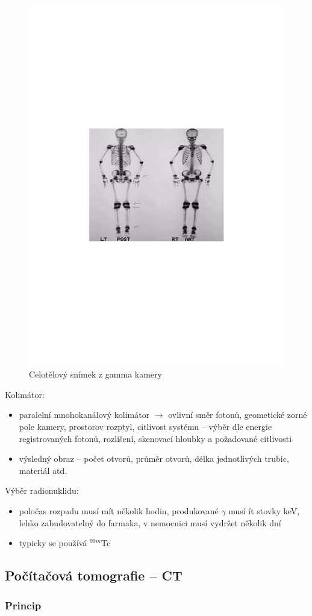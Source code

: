 \begin{figure}[H]
    \centering
    \includegraphics[width=0.5\linewidth, trim={2cm 8cm 2cm 8cm}, clip]{img/gamma_kamera_snimek.pdf}
    \caption{Celotělový snímek z gamma kamery}
    \label{fig:5_2_gamma_kamera_snimek}
\end{figure}

Kolimátor:

\begin{itemize}
    \item paralelní mnohokanálový kolimátor $\rightarrow$ ovlivní směr fotonů, geometické zorné pole kamery, prostorov rozptyl, citlivost systému -- výběr dle energie registrovaných fotonů, rozlišení, skenovací hloubky a požadované citlivosti
    \item výsledný obraz -- počet otvorů, průměr otvorů, délka jednotlivých trubic, materiál atd.
\end{itemize}

Výběr radionuklidu:

\begin{itemize}
    \item poločas rozpadu musí mít několik hodin, produkované $\gamma$ musí ít stovky keV, lehko zabudovatelný do farmaka, v nemocnici musí vydržet několik dní
    \item typicky se používá $^{99m}$Tc
\end{itemize}

\subsection{Počítačová tomografie -- CT}

\subsubsection{Princip}

